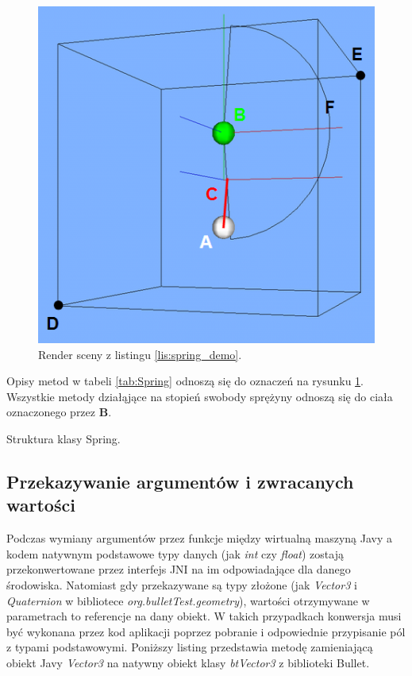 

\begin{figure}
\centering
\includegraphics[scale = 0.6]{./img/Spring-render.png}
\caption{Render sceny z listingu \ref{lis:spring_demo}.}
\label{fig:spring_demo}
\end{figure}

Opisy metod w tabeli \ref{tab:Spring} odnoszą się do oznaczeń na rysunku
\ref{fig:spring_demo}. Wszystkie metody działąjące na stopień swobody sprężyny
odnoszą się do ciała oznaczonego przez \textbf{B}.\\

\begin{table}

\caption{Struktura klasy Spring.}
\label{tab:Spring}
\end{table}

\subsection{Przekazywanie argumentów i zwracanych wartości}
Podczas wymiany argumentów przez funkcje między wirtualną maszyną Javy a kodem
natywnym podstawowe typy danych (jak \emph{int} czy \emph{float}) zostają
przekonwertowane przez interfejs JNI na im odpowiadające dla danego środowiska.
Natomiast gdy przekazywane są typy złożone (jak \emph{Vector3} i
\emph{Quaternion} w bibliotece \emph{org.bulletTest.geometry}), wartości
otrzymywane w parametrach to referencje na dany obiekt. W takich przypadkach
konwersja musi być wykonana przez kod aplikacji poprzez pobranie i odpowiednie
przypisanie pól z typami podstawowymi. Poniższy listing przedstawia metodę
zamieniającą obiekt Javy \emph{Vector3} na natywny obiekt klasy \emph{btVector3}
z biblioteki Bullet.

